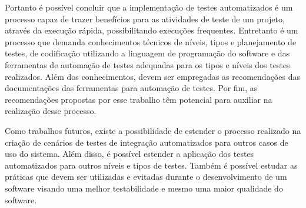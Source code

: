     Portanto é possível concluir que a implementação de testes automatizados é um processo capaz de trazer benefícios para as atividades de teste de um projeto, através da execução rápida, possibilitando execuções frequentes. Entretanto é um processo que demanda conhecimentos técnicos de níveis, tipos e planejamento de testes, de codificação utilizando a linguagem de programação do software e das ferramentas de automação de testes adequadas para os tipos e níveis dos testes realizados. Além dos conhecimentos, devem ser empregadas as recomendações das documentações das ferramentas para automação de testes. Por fim, as recomendações propostas por esse trabalho têm potencial para auxiliar na realização desse processo.
    
    Como trabalhos futuros, existe a possibilidade de estender o processo realizado na criação de cenários de testes de integração automatizados para outros casos de uso do sistema. Além disso, é possível estender a aplicação dos testes automatizados para outros níveis e tipos de testes. Também é possível estudar as práticas que devem ser utilizadas e evitadas durante o desenvolvimento de um software visando uma melhor testabilidade e mesmo uma maior qualidade do software.
    



%

